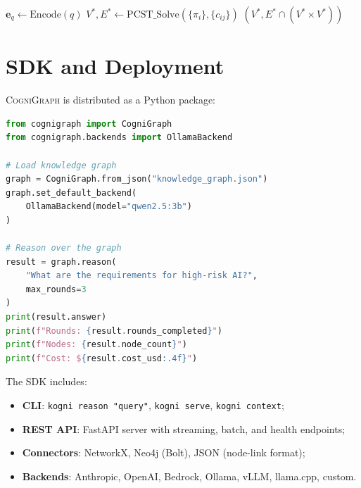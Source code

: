 \documentclass[a4paper,11pt]{article}
\theoremstyle{definition}
\newcommand{\cogni}{\textsc{CogniGraph}}
\begin{document}

\begin{algorithm}[ht]
\caption{PCST Subgraph Activation}
\label{alg:pcst}

$\mathbf{e}_q \gets \mathrm{Encode}(q)$\;
$V^*, E^* \gets \mathrm{PCST\_Solve}(\{\pi_i\}, \{c_{ij}\})$\;
\Return $(V^*, E^* \cap (V^* \times V^*))$\;
\end{algorithm}

\section{SDK and Deployment}
\label{sec:sdk}

\cogni{} is distributed as a Python package:

\begin{lstlisting}[language=Python,caption={CogniGraph SDK usage},label={lst:sdk}]
from cognigraph import CogniGraph
from cognigraph.backends import OllamaBackend

# Load knowledge graph
graph = CogniGraph.from_json("knowledge_graph.json")
graph.set_default_backend(
    OllamaBackend(model="qwen2.5:3b")
)

# Reason over the graph
result = graph.reason(
    "What are the requirements for high-risk AI?",
    max_rounds=3
)
print(result.answer)
print(f"Rounds: {result.rounds_completed}")
print(f"Nodes: {result.node_count}")
print(f"Cost: ${result.cost_usd:.4f}")
\end{lstlisting}

The SDK includes:
\begin{itemize}
\item \textbf{CLI}: \texttt{kogni reason "query"}, \texttt{kogni serve}, \texttt{kogni context};
\item \textbf{REST API}: FastAPI server with streaming, batch, and health endpoints;
\item \textbf{Connectors}: NetworkX, Neo4j (Bolt), JSON (node-link format);
\item \textbf{Backends}: Anthropic, OpenAI, Bedrock, Ollama, vLLM, llama.cpp, custom.
\end{itemize}
\end{document}
